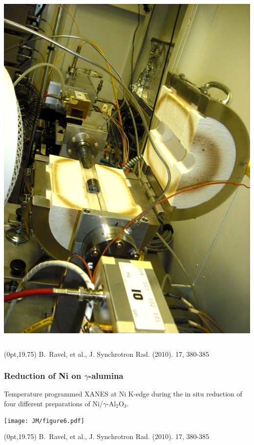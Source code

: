 \documentclass[10pt, xcolor=x11names, compress, handout]{beamer}
\begin{document}
\begin{frame}
\begin{columns}
\begin{column}{0.35\linewidth}
      \includegraphics[width=\linewidth]{JM/experiment.jpg}
    \end{column}
  \end{columns}
  \begin{textblock*}{0.5\linewidth}(0pt,19.75\TPVertModule) 
    \tiny B.\ Ravel, et al., J. Synchrotron Rad. (2010). 17, 380-385 
  \end{textblock*}
\end{frame}

\begin{frame}
  \frametitle{Reduction of Ni on $\gamma$-alumina}

  Temperature programmed XANES at Ni K-edge during the in situ
  reduction of four different preparations of Ni/$\gamma$-Al$_2$O$_3$.

  \texttt{[image: JM/figure6.pdf]}

  \begin{textblock*}{0.5\linewidth}(0pt,19.75\TPVertModule) 
    \tiny B.\ Ravel, et al., J. Synchrotron Rad. (2010). 17, 380-385 
  \end{textblock*}
\end{frame}
\end{document}
